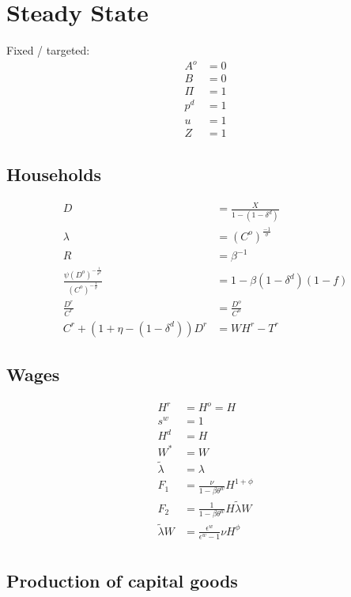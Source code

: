 \documentclass[11pt]{article}
\begin{document}
\section{Steady State}

Fixed / targeted:
\begin{align*}
	A^o &= 0 \\
	B &= 0 \\
	\Pi &= 1 \\
	p^d &= 1 \\
	u &= 1 \\
	Z& = 1
\end{align*}


\subsection{Households}
\begin{align*}
	D &=   \frac{X}{1-(1-\delta^d)} \\
	\lambda &= (C^o)^{\frac{-1}{\sigma}}  \\
	R &= \beta^{-1}  \\
	 \frac{\psi (D^o)^{-\frac{1}{\sigma^d}}}{(C^o)^{-\frac{1}{\sigma}}} & =1-\beta(1-\delta^d)(1-f) \\
	 \frac{D^r}{C^r} & = \frac{D^o}{C^o} \\
	  C^r +(1+\eta-(1-\delta^d)) D^r &= W H^r - T^r
\end{align*}



\subsection{Wages}

\begin{align*}
	H^r &= H^o = H \\
	s^w &= 1 \\
	H^d &= H \\
	W^* &= W \\
	\tilde{\lambda} &=\lambda \\
	F_{1} & = \frac{\nu}{1-\beta\theta^w} H^{1+\phi} \\
	F_{2} & = \frac{1}{1-\beta\theta^w}  H  \tilde{\lambda} W \\
	\tilde{\lambda} W&=\frac{\epsilon^w}{\epsilon^w-1}\nu H^{\phi} \\
\end{align*}


\subsection{Production of capital goods}
\end{document}
